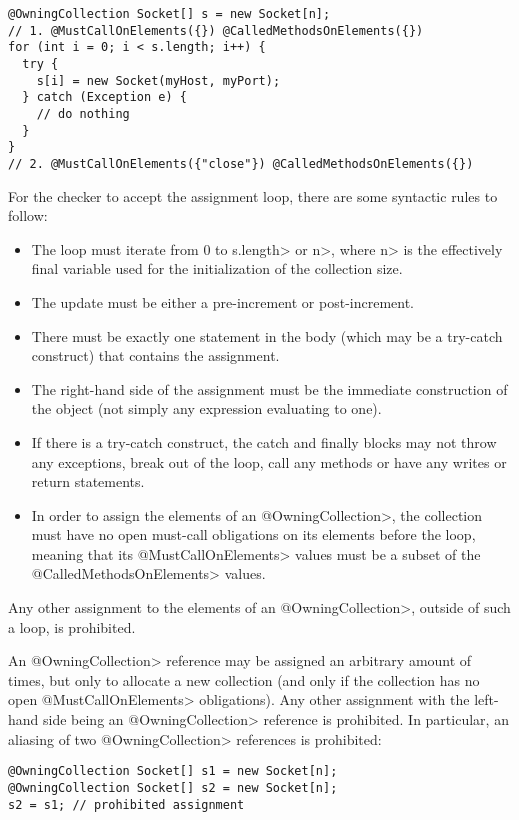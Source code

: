 \begin{verbatim}
@OwningCollection Socket[] s = new Socket[n];
// 1. @MustCallOnElements({}) @CalledMethodsOnElements({})
for (int i = 0; i < s.length; i++) {
  try {
    s[i] = new Socket(myHost, myPort);
  } catch (Exception e) {
    // do nothing
  }
}
// 2. @MustCallOnElements({"close"}) @CalledMethodsOnElements({})
\end{verbatim}
For the checker to accept the assignment loop, there are some syntactic rules to follow:
\begin{itemize}
  \item The loop must iterate from 0 to \<s.length> or \<n>, where \<n> is the effectively final variable used for the initialization of the collection size.
  \item The update must be either a pre-increment or post-increment.
  \item There must be exactly one statement in the body (which may be a try-catch construct) that contains the assignment.
  \item The right-hand side of the assignment must be the immediate construction of the object (not simply any expression evaluating to one).
  \item If there is a try-catch construct, the catch and finally blocks may not throw any exceptions, break out of the loop, call any methods or have any writes or return statements.
  \item In order to assign the elements of an \<@OwningCollection>, the collection must have no open must-call obligations on its elements before the loop, meaning that its \<@MustCallOnElements> values must be a subset of the \<@CalledMethodsOnElements> values.
\end{itemize}

\noindent Any other assignment to the elements of an \<@OwningCollection>, outside of such a loop, is prohibited.

\noindent An \<@OwningCollection> reference may be assigned an arbitrary amount of times, but only to allocate a new collection (and only if the collection has no open \<@MustCallOnElements> obligations). Any other assignment with the left-hand side being an \<@OwningCollection> reference is prohibited. In particular, an aliasing of two \<@OwningCollection> references is prohibited:

\begin{verbatim}
@OwningCollection Socket[] s1 = new Socket[n];
@OwningCollection Socket[] s2 = new Socket[n];
s2 = s1; // prohibited assignment
\end{verbatim}

